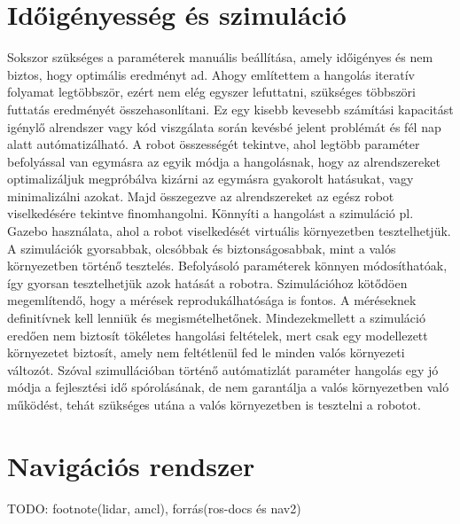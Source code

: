 \section{Időigényesség és szimuláció}
Sokszor szükséges a paraméterek manuális beállítása, amely időigényes és nem biztos, hogy optimális eredményt ad. Ahogy említettem a hangolás iteratív folyamat legtöbbször, ezért nem elég egyszer lefuttatni, szükséges többszöri futtatás eredményét összehasonlítani. Ez egy kisebb kevesebb számítási kapacitást igénylő alrendszer vagy kód viszgálata során kevésbé jelent problémát és fél nap alatt autómatizálható. A robot összességét tekintve, ahol legtöbb paraméter befolyással van egymásra az egyik módja a hangolásnak, hogy az alrendszereket optimalizáljuk megpróbálva kizárni az egymásra gyakorolt hatásukat, vagy minimalizálni azokat. Majd összegezve az alrendszereket az egész robot viselkedésére tekintve finomhangolni. Könnyíti a hangolást a szimuláció pl. Gazebo használata, ahol a robot viselkedését virtuális környezetben tesztelhetjük. A szimulációk gyorsabbak, olcsóbbak és biztonságosabbak, mint a valós környezetben történő tesztelés. Befolyásoló paraméterek könnyen módosíthatóak, így gyorsan tesztelhetjük azok hatását a robotra. Szimulációhoz kötődöen megemlítendő, hogy a mérések reprodukálhatósága is fontos. A méréseknek definitívnek kell lenniük és megismételhetőnek. Mindezekmellett a szimuláció eredően nem biztosít tökéletes hangolási feltételek, mert csak egy modellezett környezetet biztosít, amely nem feltétlenül fed le minden valós környezeti változót. Szóval szimullációban történő autómatizlát paraméter hangolás egy jó módja a fejlesztési idő spórolásának, de nem garantálja a valós környezetben való működést, tehát szükséges utána a valós környezetben is tesztelni a robotot.

\section{Navigációs rendszer}
TODO: footnote(lidar, amcl), forrás(ros-docs és nav2)

